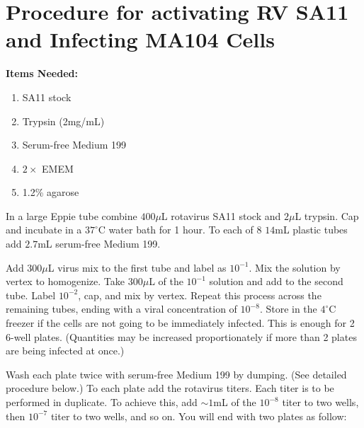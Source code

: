 \section{Procedure for activating RV SA11 and Infecting MA104 Cells}

{\bfseries Items Needed:} \begin{enumerate}
	\item SA11 stock
	\item Trypsin (2mg/mL)
	\item Serum-free Medium 199
	\item $2\times$ EMEM
	\item 1.2\% agarose
\end{enumerate}

In a large Eppie tube combine $400\mu$L rotavirus SA11 stock and $2\mu$L trypsin. Cap and incubate in a $37^{\circ}$C water bath for 1 hour. To each of 8 $14$mL plastic tubes add $2.7$mL serum-free Medium 199.

Add $300\mu$L virus mix to the first tube and label as $10^{-1}$. Mix the solution by vertex to homogenize. Take $300\mu$L of the $10^{-1}$ solution and add to the second tube. Label $10^{-2}$, cap, and mix by vertex. Repeat this process across the remaining tubes, ending with a viral concentration of $10^{-8}$. Store in the $4^{\circ}$C freezer if the cells are not going to be immediately infected. This is enough for 2 6-well plates. (Quantities may be increased proportionately if more than 2 plates are being infected at once.)

Wash each plate twice with serum-free Medium 199 by dumping. (See detailed procedure below.) To each plate add the rotavirus titers. Each titer is to be performed in duplicate. To achieve this, add $\sim 1$mL of the $10^{-8}$ titer to two wells, then $10^{-7}$ titer to two wells, and so on. You will end with two plates as follow:

